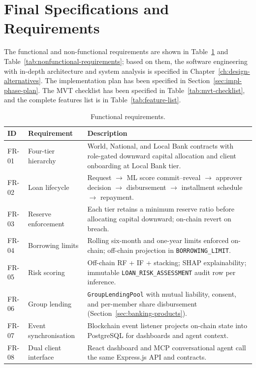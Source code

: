 \label{ch:specifications-impact}

\section{Final Specifications and Requirements}
\label{sec:specifications-requirements}
The functional and non-functional requirements are shown in Table~\ref{tab:functional-requirements} and Table~\ref{tab:nonfunctional-requirements}; based on them, the software engineering with in-depth architecture and system analysis is specified in Chapter~\ref{ch:design-alternatives}. The implementation plan has been specified in Section~\ref{sec:impl-phase-plan}. The MVT checklist has been specified in Table~\ref{tab:mvt-checklist}, and the complete features list is in Table~\ref{tab:feature-list}.

\begin{table}[H]
\centering
\caption[Functional requirements]{Functional requirements.}
\label{tab:functional-requirements}
\small
\begin{tabular}{@{}p{1.2cm}p{4.2cm}p{8.8cm}@{}}
\toprule
\tableheadcolor
\textbf{ID} & \textbf{Requirement} & \textbf{Description} \\
\midrule
FR-01 & Four-tier hierarchy & World, National, and Local Bank contracts with role-gated downward capital allocation and client onboarding at Local Bank tier. \\
FR-02 & Loan lifecycle & Request $\to$ ML score commit--reveal $\to$ approver decision $\to$ disbursement $\to$ installment schedule $\to$ repayment. \\
FR-03 & Reserve enforcement & Each tier retains a minimum reserve ratio before allocating capital downward; on-chain revert on breach. \\
FR-04 & Borrowing limits & Rolling six-month and one-year limits enforced on-chain; off-chain projection in \texttt{BORROWING\_LIMIT}. \\
FR-05 & Risk scoring & Off-chain RF + IF + stacking; SHAP explainability; immutable \texttt{LOAN\_RISK\_ASSESSMENT} audit row per inference. \\
FR-06 & Group lending & \texttt{GroupLendingPool} with mutual liability, consent, and per-member share disbursement (Section~\ref{sec:banking-products}). \\
FR-07 & Event synchronisation & Blockchain event listener projects on-chain state into PostgreSQL for dashboards and agent context. \\
FR-08 & Dual client interface & React dashboard and MCP conversational agent call the same Express.js API and contracts. \\
\bottomrule
\end{tabular}
\end{table}

